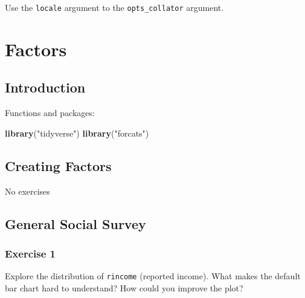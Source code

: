 \documentclass[]{book}
\newenvironment{Shaded}{\begin{snugshade}}{\end{snugshade}}
\newcommand{\KeywordTok}[1]{\textcolor[rgb]{0.13,0.29,0.53}{\textbf{#1}}}
\newcommand{\NormalTok}[1]{#1}
\newcommand{\OperatorTok}[1]{\textcolor[rgb]{0.81,0.36,0.00}{\textbf{#1}}}
\newcommand{\StringTok}[1]{\textcolor[rgb]{0.31,0.60,0.02}{#1}}
\theoremstyle{plain}
\theoremstyle{remark}
\theoremstyle{definition}
\theoremstyle{definition}
\theoremstyle{definition}
\theoremstyle{remark}
\begin{document}
Use the \texttt{locale} argument to the \texttt{opts\_collator}
argument.

\hypertarget{factors}{%
\chapter{Factors}\label{factors}}

\hypertarget{introduction-10}{%
\section{Introduction}\label{introduction-10}}

Functions and packages:

\begin{Shaded}
\begin{Highlighting}[]
\KeywordTok{library}\NormalTok{(}\StringTok{"tidyverse"}\NormalTok{)}
\KeywordTok{library}\NormalTok{(}\StringTok{"forcats"}\NormalTok{)}
\end{Highlighting}
\end{Shaded}

\hypertarget{creating-factors}{%
\section{Creating Factors}\label{creating-factors}}

No exercises

\hypertarget{general-social-survey}{%
\section{General Social Survey}\label{general-social-survey}}

\hypertarget{exercise-1-43}{%
\subsection{Exercise 1}\label{exercise-1-43}}

Explore the distribution of \texttt{rincome} (reported income). What
makes the default bar chart hard to understand? How could you improve
the plot?

\begin{Shaded}
\end{Shaded}
\end{document}
